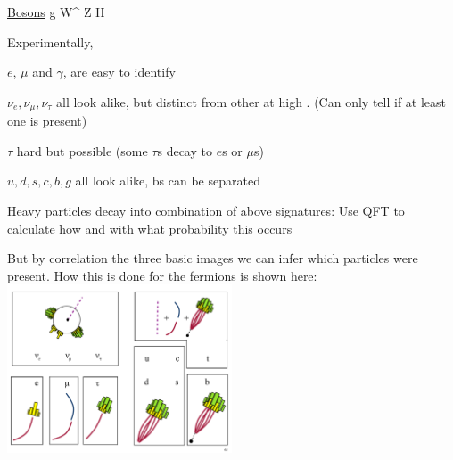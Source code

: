 {\underline{Bosons}
\be
g \times {}  \hspace*{0.2in} W^\pm  \hspace*{0.2in} Z  \hspace*{0.2in} \gamma    \hspace*{0.2in} H
\ee

\lineacross

Experimentally, 

\bi
\item[-] $e$, $\mu$ and $\gamma$, are easy to identify 
\item[-] $\nu_e, \nu_\mu, \nu_\tau$ all look alike, but distinct from other at high \pt.  (Can only tell if at least one is present) 
\item[-] $\tau$ hard but possible (some $\tau$s decay to $e$s or $\mu$s)
\item[-] $u,d,s,c,b,g$ all look alike, bs can be separated 
\item[-] Heavy particles decay into combination of above signatures: Use QFT to calculate how and with what probability this occurs 
\ei

But by correlation the three basic images we can infer which particles were present. 
How this is done for the fermions is shown here:
\bc
\includegraphics[width=0.5\textwidth]{./Fermions.pdf}
\ec

}
